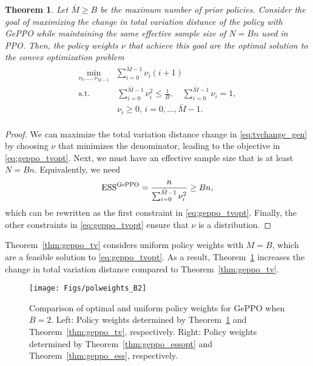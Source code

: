 \documentclass{article}
\newtheorem{theorem}{Theorem}
\begin{document}
\begin{theorem}\label{thm:geppo_tvopt}
Let $\bar{M} \geq B$ be the maximum number of prior policies. Consider the goal of maximizing the change in total variation distance of the policy with GePPO while maintaining the same effective sample size of $N=Bn$ used in PPO. Then, the policy weights $\nu$ that achieve this goal are the optimal solution to the convex optimization problem
\begin{equation}\label{eq:geppo_tvopt}
\begin{split}
\min_{\nu_0,\ldots,\nu_{\bar{M}-1}} & \sum_{i=0}^{\bar{M}-1} \nu_i (i+1)  \\
\mathrm{s.t.} \quad & \, \sum_{i=0}^{\bar{M}-1} \nu_i^2 \leq \frac{1}{B}, \quad  \sum_{i=0}^{\bar{M}-1} \nu_i = 1,  \\
 & \, \nu_i \geq 0, \, i=0,\ldots,\bar{M}-1. \\
\end{split}
\end{equation}
\end{theorem}

\begin{proof}
We can maximize the total variation distance change in \eqref{eq:tvchange_gen} by choosing $\nu$ that minimizes the denominator, leading to the objective in \eqref{eq:geppo_tvopt}. Next, we must have an effective sample size that is at least $N=Bn$. Equivalently, we need
\begin{equation}
\operatorname{ESS}^\textnormal{GePPO} = \frac{n}{\sum_{i=0}^{\bar{M}-1} \nu_i^2} \geq Bn,
\end{equation}
which can be rewritten as the first constraint in \eqref{eq:geppo_tvopt}. Finally, the other constraints in \eqref{eq:geppo_tvopt} ensure that $\nu$ is a distribution.
\end{proof}

Theorem~\ref{thm:geppo_tv} considers uniform policy weights with $M=B$, which are a feasible solution to \eqref{eq:geppo_tvopt}. As a result, Theorem~\ref{thm:geppo_tvopt} increases the change in total variation distance compared to Theorem~\ref{thm:geppo_tv}.

\begin{figure}
\centering
\texttt{[image: Figs/polweights\_B2]}
\caption{Comparison of optimal and uniform policy weights for GePPO when $B=2$. Left: Policy weights determined by Theorem~\ref{thm:geppo_tvopt} and Theorem~\ref{thm:geppo_tv}, respectively. Right: Policy weights determined by Theorem~\ref{thm:geppo_essopt} and Theorem~\ref{thm:geppo_ess}, respectively.}\label{fig:polweights}
\end{figure}
\end{document}
